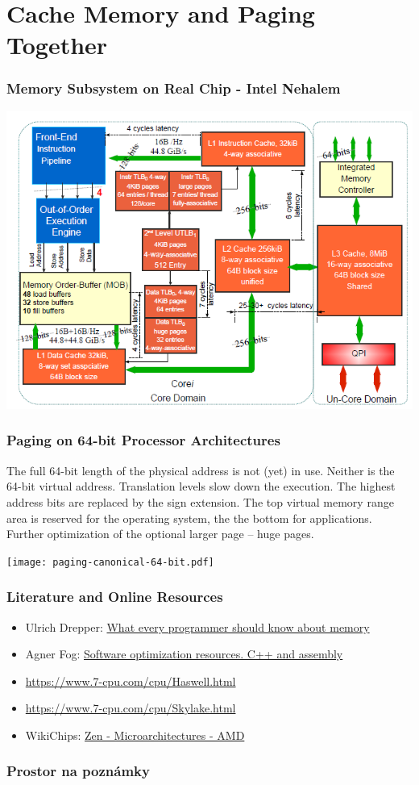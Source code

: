\documentclass{beamer}
\begin{document}
\section{Cache Memory and Paging Together}

\begin{frame}
\frametitle{Memory Subsystem on Real Chip - Intel Nehalem}

{
\centering

\includegraphics[width=0.80\linewidth]{fig/mem-nehalem-lat.png}

}

\end{frame}

\begin{frame}
\frametitle{Paging on 64-bit Processor Architectures}

The full 64-bit length of the physical address is not (yet) in use.
Neither is the 64-bit virtual address. Translation levels slow down the execution.
The highest address bits are replaced by the sign extension.
The top virtual memory range area is reserved for the operating system, the the bottom for applications.
Further optimization of the optional larger page -- huge pages.

{
\centering

\texttt{[image: paging-canonical-64-bit.pdf]}

}
\end{frame}

\begin{frame}
\frametitle{Literature and Online Resources}

\begin{itemize}
\item Ulrich Drepper: \href{https://lwn.net/Articles/250967/}{What every programmer should know about memory}
\item Agner Fog: \href{https://www.agner.org/optimize/}{Software optimization resources. C++ and assembly}
\item \url{https://www.7-cpu.com/cpu/Haswell.html}
\item \url{https://www.7-cpu.com/cpu/Skylake.html}
\item WikiChips: \href{https://en.wikichip.org/wiki/amd/microarchitectures/zen}{Zen - Microarchitectures - AMD}

\end{itemize}

\end{frame}

\begin{frame}
\frametitle{Prostor na poznámky}

\end{frame}
\end{document}
